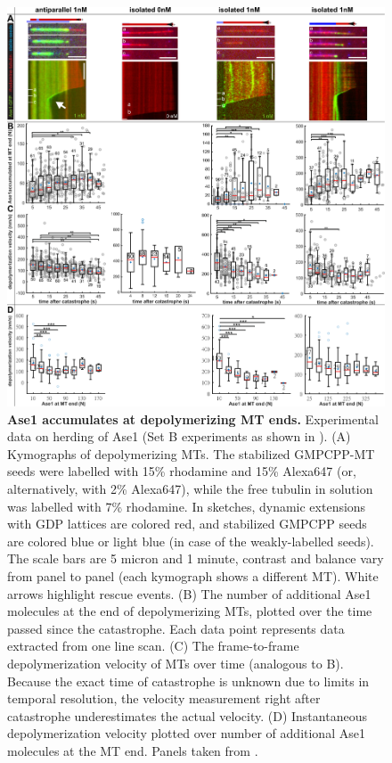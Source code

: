 \begin{figure}[h!]
    \centering
    \includegraphics[width=1\linewidth]{Figures/ase2b.png}
    \caption[Ase1 accumulates at depolymerizing MT ends.]{\textbf{Ase1 accumulates at depolymerizing MT ends.} Experimental data on herding of Ase1 (Set B experiments as shown in ). (A) Kymographs of depolymerizing MTs. The stabilized GMPCPP-MT seeds were labelled with 15\% rhodamine and 15\% Alexa647 (or, alternatively, with 2\% Alexa647), while the free tubulin in solution was labelled with 7\% rhodamine. In sketches, dynamic extensions with GDP lattices are colored red, and stabilized GMPCPP seeds are colored blue or light blue (in case of the weakly-labelled seeds). The scale bars are 5 micron and 1 minute, contrast and balance vary from panel to panel (each kymograph shows a different MT). White arrows highlight rescue events. (B) The number of additional Ase1 molecules at the end of depolymerizing MTs, plotted over the time passed since the catastrophe. Each data point represents data extracted from one line scan. (C) The frame-to-frame depolymerization velocity of MTs over time (analogous to B). Because the exact time of catastrophe is unknown due to limits in temporal resolution, the velocity measurement right after catastrophe underestimates the actual velocity. (D) Instantaneous depolymerization velocity plotted over number of additional Ase1 molecules at the MT end. Panels taken from \cite{Krattenmacher2024}.
        }\label{ase2b}
\end{figure}

